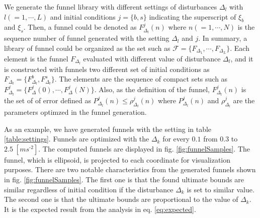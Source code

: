 \documentclass[letterpaper, 10 pt, conference]{ieeeconf}  %
\begin{document}
We generate the funnel library with different settings of disturbances $\Delta_l$ with $l(=1,\cdots,L)$ and initial conditions $j=\{b,s\}$ indicating the superscript of $\xi_b$ and $\xi_s$.
Then, a funnel could be denoted as $F_{\Delta_l}^j(n)$ where $n(=1,\cdots,N)$ is the sequence number of funnel generated with the setting $\Delta_l$ and $j$.
In summary, a library of funnel could be organized as the set such as $\mathcal{F} = \{F_{\Delta_1},\cdots,F_{\Delta_L}\}$.
Each element is the funnel $F_{\Delta_l}$ evaluated with different value of disturbance $\Delta_l$, 
and it is constructed with funnels two different set of initial conditions as $F_{\Delta_l} = \{F_{\Delta_l}^b,F_{\Delta_l}^s\}$. The elements are the sequence of compact sets such as $F_{\Delta_l}^j = \{F_{\Delta}^j(0),\cdots,F_{\Delta}^j(N)\}$.
Also, as the definition of the funnel, $F_{\Delta_l}^j(n)$ is the set of of error defined as $P_{\Delta_l}^j(n) \leq \rho_{\Delta_l}^j(n)$ where $P_{\Delta_l}^j(n)$ and $\rho_{\Delta_l}^j$ are the parameters optimzed in the funnel generation.


As an example, we have generated funnels with the setting in table \ref{table:settings}.
Funnels are optimized with the $\Delta_k$ for every $0.1$ from $0.3$ to $2.5\;[m s^\text{-2}]$. 
The computed funnels are displayed in fig. \ref{fig:funnelSamples}.
The funnel, which is ellipsoid, is projected to each coordinate for visualization purposes.
There are two notable characteristics from the generated funnels shown in fig. \ref{fig:funnelSamples}. 
The first one is that the found ultimate bounds are similar regardless of initial condition if the disturbance $\Delta_k$ is set to similar value. 
The second one is that the ultimate bounds are proportional to the value of $\Delta_k$. 
It is the expected result from the analysis in eq. \eqref{eq:expected}.
\end{document}
